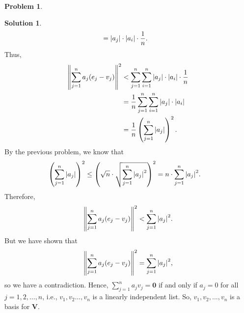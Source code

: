 \documentclass{article}
\theoremstyle{definition}
\newtheorem*{prob*}{Problem}
\newtheorem*{sln*}{Solution}
\newcommand{\V}{\mathbf{V}}
\begin{document}
\begin{prob*}
\begin{enumerate}
\begin{sln*}
\begin{align*}
			&= \abs{a_j}\cdot \abs{a_i}\cdot \frac{1}{n}.
			\end{align*}
			Thus,
			\begin{align*}
			\norm{\sum^n_{j=1} a_j(e_j - v_j)}^2
			&< \sum^n_{j=1}\sum^n_{i=1} \abs{a_j}\cdot \abs{a_i}\cdot \frac{1}{n}\\
			&= \frac{1}{n}\sum^n_{j=1}\sum^n_{i=1} \abs{a_j}\cdot \abs{a_i}\\
			&= \frac{1}{n}\left( \sum^n_{j=1}\vert a_j\vert \right)^2.
			\end{align*}
			By the previous problem, we know that
			\begin{align*}
			\left( \sum^n_{j=1}\vert a_j\vert \right)^2 
			&\leq \left( \sqrt{n}\cdot \sqrt{\sum^n_{j=1}\abs{a_j}^2 } \right)^2
			= n\cdot \sum^n_{j=1}\abs{a_j}^2.
			\end{align*}
			Therefore,
			\begin{align*}
			\norm{\sum^n_{j=1} a_j(e_j - v_j)}^2 < \sum^n_{j=1}\abs{a_j}^2.
			\end{align*}
			But we have shown that
			\begin{align*}
			\norm{\sum^n_{j=1} a_j(e_j - v_j)}^2 = \sum^n_{j=1}\abs{a_j}^2,
			\end{align*}
			so we have a contradiction. Hence, $\sum^n_{j=1}a_jv_j = \mathbf{0}$ if and only if $a_j = 0$ for all $j=1,2,\dots,n$, i.e., $v_1,v_2\dots,v_n$ is a linearly independent list. So, $v_1, v_2,\dots,v_n$ is a basis for $\V$.
		\end{sln*}
	\end{enumerate}
	
\end{prob*}




\newpage
\end{document}
